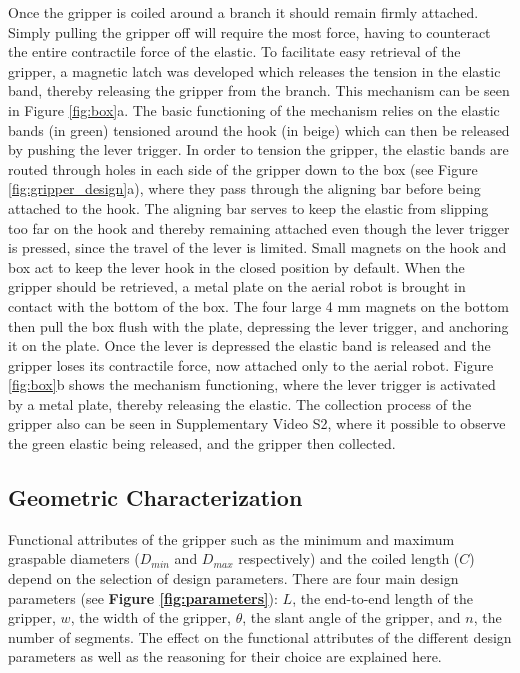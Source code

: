 Once the gripper is coiled around a branch it should remain firmly attached. Simply pulling the gripper off will require the most force, having to counteract the entire contractile force of the elastic. To facilitate easy retrieval of the gripper, a magnetic latch was developed which releases the tension in the elastic band, thereby releasing the gripper from the branch. This mechanism can be seen in Figure \ref{fig:box}a. The basic functioning of the mechanism relies on the elastic bands (in green) tensioned around the hook (in beige) which can then be released by pushing the lever trigger. In order to tension the gripper, the elastic bands are routed through holes in each side of the gripper down to the box (see Figure \ref{fig:gripper_design}a), where they pass through the aligning bar before being attached to the hook. The aligning bar serves to keep the elastic from slipping too far on the hook and thereby remaining attached even though the lever trigger is pressed, since the travel of the lever is limited. Small magnets on the hook and box act to keep the lever hook in the closed position by default. When the gripper should be retrieved, a metal plate on the aerial robot is brought in contact with the bottom of the box. The four large 4 mm magnets on the bottom then pull the box flush with the plate, depressing the lever trigger, and anchoring it on the plate. Once the lever is depressed the elastic band is released and the gripper loses its contractile force, now attached only to the aerial robot. Figure \ref{fig:box}b shows the mechanism  functioning, where the lever trigger is activated by a metal plate, thereby releasing the elastic. The collection process of the gripper also can be seen in Supplementary Video S2, where it possible to observe the green elastic being released, and the gripper then collected.

\subsection{Geometric Characterization}
\label{subsec:parameter_selection}
Functional attributes of the gripper such as the minimum and maximum graspable diameters ($D_{min}$ and $D_{max}$ respectively) and the coiled length ($C$) depend on the selection of design parameters. There are four main design parameters (see \textbf{Figure \ref{fig:parameters}}): $L$, the end-to-end length of the gripper, $w$, the width of the gripper, $\theta$, the slant angle of the gripper, and $n$, the number of segments. The effect on the functional attributes of the different design parameters as well as the reasoning for their choice are explained here. 

